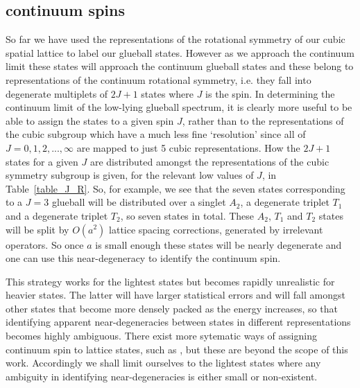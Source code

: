 \documentclass[12pt]{article}
\begin{document}
%
%
\subsection{continuum spins}
\label{subsection_spins} 

So far we have used the representations of the rotational symmetry of our cubic spatial
lattice to label our glueball states. However as we approach the continuum limit these
states will approach the continuum glueball states and these belong to representations of
the continuum rotational symmetry, i.e. they fall into degenerate multiplets of $2J+1$ states
where $J$ is the spin. In determining the continuum limit of the low-lying glueball spectrum,
it is clearly more useful to be able to assign the states to a given spin $J$, rather
than to the representations of the cubic subgroup which have a much less fine `resolution'
since all of $J=0,1,2,...,\infty$ are mapped to just 5 cubic representations. 
How the $2J+1$ states for a given $J$ are distributed amongst the representations of the
cubic symmetry subgroup is given, for the relevant low values of $J$, in Table~\ref{table_J_R}.
So, for example, we see that the seven states
corresponding to a $J=3$ glueball will be distributed over a singlet $A_2$, a degenerate
triplet $T_1$ and a degenerate triplet $T_2$, so seven states in total. These $A_2$, $T_1$ and $T_2$
states will be split by $O(a^2)$ lattice spacing corrections, generated by irrelevant operators.
So once $a$ is small enough these states will be nearly degenerate and one can use this
near-degeneracy to identify the continuum spin. 

This strategy works for the lightest states but becomes rapidly unrealistic for heavier
states. The latter will have larger statistical errors and will fall amongst other states
that become more densely packed as the energy increases, so that identifying apparent
near-degeneracies between states in different representations becomes highly ambiguous.
There exist more sytematic ways of assigning continuum spin to lattice states, such as
%
\cite{HMMT-2004,HM_Thesis,PCSDMT-2019},
%
but these are beyond the scope of this work. Accordingly we shall limit ourselves to the
lightest states where any ambiguity in identifying near-degeneracies is either small
or non-existent.
\end{document}
